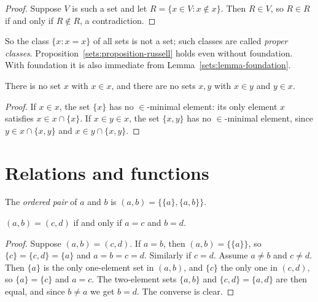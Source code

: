 \begin{proof}
Suppose $V$ is such a set and let $R = \{x \in V : x \notin x\}$. Then
$R \in V$, so $R \in R$ if and only if $R \notin R$, a contradiction.
\end{proof}

\begin{remark}\label{sets:remark-proper-classes}
So the class $\{x : x = x\}$ of all sets is not a set; such classes are
called \emph{proper classes}. Proposition~\ref{sets:proposition-russell} holds
even without foundation. With foundation it is also immediate from
Lemma~\ref{sets:lemma-foundation}.
\end{remark}

\begin{lemma}\label{sets:lemma-foundation}
There is no set $x$ with $x \in x$, and there are no sets $x, y$ with
$x \in y$ and $y \in x$.
\end{lemma}

\begin{proof}
If $x \in x$, the set $\{x\}$ has no $\in$-minimal element: its only element
$x$ satisfies $x \in x \cap \{x\}$. If $x \in y \in x$, the set $\{x, y\}$ has no
$\in$-minimal element, since $y \in x \cap \{x,y\}$ and $x \in y \cap \{x,y\}$.
\end{proof}

\section{Relations and functions}\label{sets:section-relations}

\begin{definition}\label{sets:definition-ordered-pair}
The \emph{ordered pair} of $a$ and $b$ is $(a, b) = \{\{a\}, \{a, b\}\}$.
\end{definition}

\begin{lemma}\label{sets:lemma-ordered-pair}
$(a, b) = (c, d)$ if and only if $a = c$ and $b = d$.
\end{lemma}

\begin{proof}
Suppose $(a, b) = (c, d)$. If $a = b$, then $(a, b) = \{\{a\}\}$, so
$\{c\} = \{c, d\} = \{a\}$ and $a = b = c = d$. Similarly if $c = d$. Assume
$a \neq b$ and $c \neq d$. Then $\{a\}$ is the only one-element set in
$(a, b)$, and $\{c\}$ the only one in $(c, d)$, so $\{a\} = \{c\}$ and $a = c$.
The two-element sets $\{a, b\}$ and $\{c, d\} = \{a, d\}$ are then equal, and
since $b \neq a$ we get $b = d$. The converse is clear.
\end{proof}


